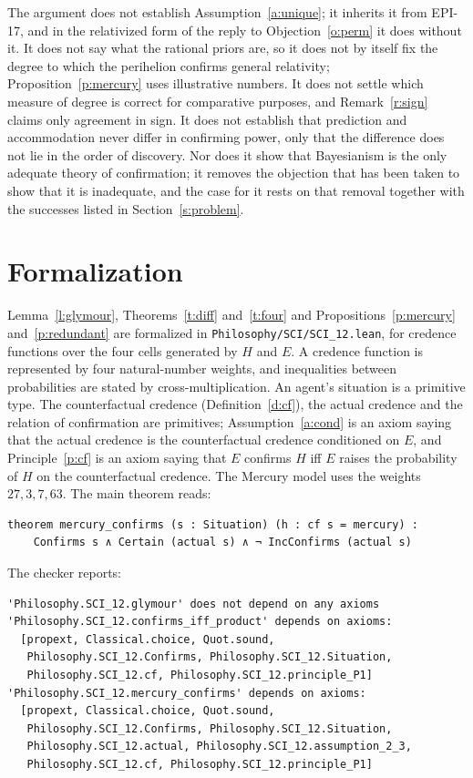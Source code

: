 \documentclass{situationist-preprint}
\begin{document}
The argument does not establish Assumption~\ref{a:unique}; it inherits it from EPI-17, and in the relativized form of the reply to Objection~\ref{o:perm} it does without it. It does not say what the rational priors are, so it does not by itself fix the degree to which the perihelion confirms general relativity; Proposition~\ref{p:mercury} uses illustrative numbers. It does not settle which measure of degree is correct for comparative purposes, and Remark~\ref{r:sign} claims only agreement in sign. It does not establish that prediction and accommodation never differ in confirming power, only that the difference does not lie in the order of discovery. Nor does it show that Bayesianism is the only adequate theory of confirmation; it removes the objection that has been taken to show that it is inadequate, and the case for it rests on that removal together with the successes listed in Section~\ref{s:problem}.

\section{Formalization}\label{s:formal}

Lemma~\ref{l:glymour}, Theorems~\ref{t:diff} and~\ref{t:four} and Propositions~\ref{p:mercury} and~\ref{p:redundant} are formalized in \nolinkurl{Philosophy/SCI/SCI_12.lean}, for credence functions over the four cells generated by $H$ and $E$. A credence function is represented by four natural-number weights, and inequalities between probabilities are stated by cross-multiplication. An agent's situation is a primitive type. The counterfactual credence (Definition~\ref{d:cf}), the actual credence and the relation of confirmation are primitives; Assumption~\ref{a:cond} is an axiom saying that the actual credence is the counterfactual credence conditioned on $E$, and Principle~\ref{p:cf} is an axiom saying that $E$ confirms $H$ iff $E$ raises the probability of $H$ on the counterfactual credence. The Mercury model uses the weights $27, 3, 7, 63$. The main theorem reads:

\begin{lstlisting}
theorem mercury_confirms (s : Situation) (h : cf s = mercury) :
    Confirms s ∧ Certain (actual s) ∧ ¬ IncConfirms (actual s)
\end{lstlisting}

\noindent The checker reports:

\begin{lstlisting}
'Philosophy.SCI_12.glymour' does not depend on any axioms
'Philosophy.SCI_12.confirms_iff_product' depends on axioms:
  [propext, Classical.choice, Quot.sound,
   Philosophy.SCI_12.Confirms, Philosophy.SCI_12.Situation,
   Philosophy.SCI_12.cf, Philosophy.SCI_12.principle_P1]
'Philosophy.SCI_12.mercury_confirms' depends on axioms:
  [propext, Classical.choice, Quot.sound,
   Philosophy.SCI_12.Confirms, Philosophy.SCI_12.Situation,
   Philosophy.SCI_12.actual, Philosophy.SCI_12.assumption_2_3,
   Philosophy.SCI_12.cf, Philosophy.SCI_12.principle_P1]
\end{lstlisting}
\end{document}
